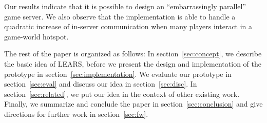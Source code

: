 Our results indicate that it is possible to design an ``embarrassingly
parallel'' game server. We also observe that the implementation is
able to handle a quadratic increase of in-server communication when
many players interact in a game-world hotspot. 

The rest of the paper is organized as follows: In
section~\ref{sec:concept}, we describe the basic idea of LEARS, before
we present the design and implementation of the prototype in
section~\ref{sec:implementation}. We evaluate our prototype in
section~\ref{sec:eval} and discuss our idea in
section~\ref{sec:disc}. In section~\ref{sec:related}, we put our idea
in the context of other existing work. Finally, we summarize and conclude
the paper in section~\ref{sec:conclusion} and give directions for
further work in section~\ref{sec:fw}.

